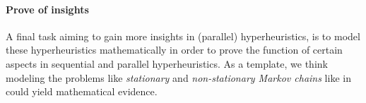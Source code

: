 \documentclass{IEEEconf}
\begin{document}
\paragraph{Prove of insights}
A final task aiming to gain more insights in (parallel) hyperheuristics, is to model these hyperheuristics mathematically in order to prove the function of certain aspects in sequential and parallel hyperheuristics. As a template, we think modeling the problems like \emph{stationary} and \emph{non-stationary Markov chains} like in \cite{Shonkwiler94parallelspeed-up} could yield mathematical evidence.


\end{document}
